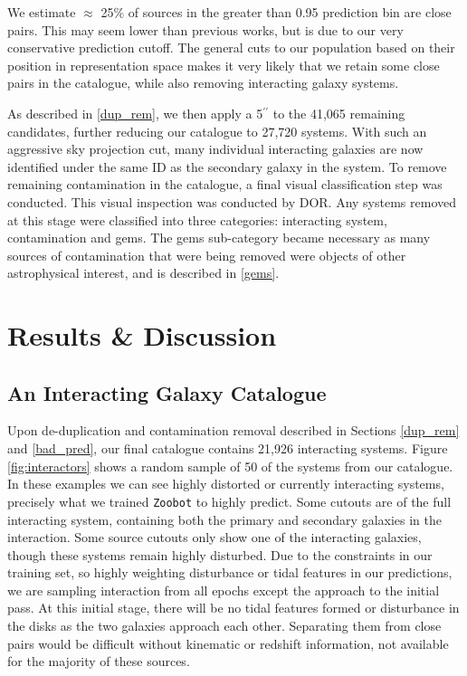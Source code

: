 {We estimate $\approx$ 25\% of sources in the greater than 0.95 prediction bin are close pairs. This may seem lower than previous works, but is due to our very conservative prediction cutoff. The general cuts to our population based on their position in representation space makes it very likely that we retain some close pairs in the catalogue, while also removing interacting galaxy systems.

As described in \DIFdelbegin {}\DIFdelend \DIFaddbegin {}\DIFaddend \ref{dup_rem}, we then apply a 5$^{\prime \prime}$ to the 41,065 remaining candidates, further reducing our catalogue to 27,720 systems. With such an aggressive sky projection cut, many individual interacting galaxies are now identified under the same ID as the secondary galaxy in the system. To remove remaining contamination in the catalogue, a final visual classification step was conducted. This visual inspection was conducted by DOR. Any systems removed at this stage were classified into three categories: interacting system, contamination and gems. The gems sub-category became necessary as many sources of contamination that were being removed were objects of other astrophysical interest, and is described in \DIFdelbegin {}\DIFdelend \DIFaddbegin {}\DIFaddend \ref{gems}.


\section{Results \& Discussion}\label{results}
\subsection{An Interacting Galaxy Catalogue}\label{int_cat}
\noindent Upon de-duplication and contamination removal described in Sections \ref{dup_rem} and \ref{bad_pred}, our final catalogue contains 21,926 interacting systems. Figure \ref{fig:interactors} shows a random sample of 50 of the systems from our catalogue. In these examples we can see highly distorted or currently interacting systems, precisely what we trained \texttt{Zoobot} to highly predict. Some cutouts are of the full interacting system, containing both the primary and secondary galaxies in the interaction. Some source cutouts only show one of the interacting galaxies, though these systems remain highly disturbed. Due to the constraints in our training set, so highly weighting disturbance or tidal features in our predictions, we are sampling interaction from all epochs except the approach to the initial pass. At this initial stage, there will be no tidal features formed or disturbance in the disks as the two galaxies approach each other. Separating them from close pairs would be difficult without kinematic or redshift information, not available for the majority of these sources.

}
